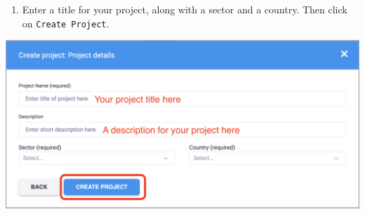 \documentclass[
  letterpaper,
  DIV=11,
  numbers=noendperiod]{scrartcl}
\providecommand{\tightlist}{%
  \setlength{\itemsep}{0pt}\setlength{\parskip}{0pt}}\usepackage{longtable,booktabs,array}
\begin{document}
\begin{enumerate}
\def\labelenumi{\arabic{enumi}.}
\setcounter{enumi}{3}
\tightlist
\item
  Enter a title for your project, along with a sector and a country.
  Then click on \texttt{Create\ Project}.
\end{enumerate}

\includegraphics{kobotoolbox_tutorial_files/img/img6.png}
\end{document}
